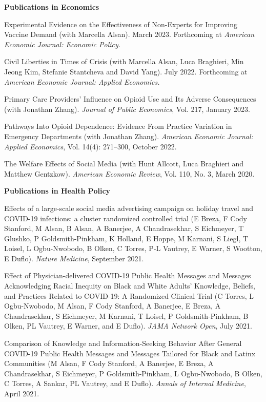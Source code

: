 \documentclass[letterpaper,11pt]{article}
\begin{document}
\begin{normalsize}
\textbf{Publications in Economics}

\setlength{\parindent}{0pt}

\hangindent=0.7cm Experimental Evidence on the Effectiveness of Non-Experts for Improving Vaccine Demand (with Marcella Alsan). March 2023. Forthcoming at \textit{American Economic Journal: Economic Policy.}
\smallskip

\hangindent=0.7cm Civil Liberties in Times of Crisis (with Marcella Alsan, Luca Braghieri, Min Jeong Kim, Stefanie Stantcheva and David Yang). July 2022. Forthcoming at \textit{American Economic Journal: Applied Economics.} 
\smallskip

\hangindent=0.7cm Primary Care Providers’ Influence on Opioid Use and Its Adverse Consequences (with Jonathan Zhang). \textit{Journal of Public Economics}, Vol. 217, January 2023.  
\smallskip

\hangindent=0.7cm Pathways Into Opioid Dependence: Evidence From Practice Variation in Emergency Departments (with Jonathan Zhang). \textit{American Economic Journal: Applied Economics}, Vol. 14(4): 271–300, October 2022. 
\medskip

\hangindent=0.7cm    The Welfare Effects of Social Media (with Hunt Allcott, Luca Braghieri and Matthew Gentzkow). \textit{American Economic Review}, Vol. 110, No. 3, March 2020. 
\smallskip

\textbf{Publications in Health Policy} 
\smallskip

\hangindent=0.7cm Effects of a large-scale social media advertising campaign on holiday travel and COVID-19 infections: a cluster randomized controlled trial (E Breza, F Cody Stanford, M Alsan, B Alsan, A Banerjee, A Chandrasekhar, S Eichmeyer, T Glushko, P Goldsmith-Pinkham, K Holland, E Hoppe, M Karnani, S Liegl, T Loisel, L Ogbu-Nwobodo, B Olken, C Torres, P-L Vautrey, E Warner, S Wootton, E Duflo).  \textit{Nature Medicine}, September 2021.  
\smallskip

\hangindent=0.7cm  Effect of Physician-delivered COVID-19 Public Health Messages and Messages Acknowledging Racial Inequity on Black and White Adults' Knowledge, Beliefs, and Practices Related to COVID-19: A Randomized Clinical Trial (C Torres, L Ogbu-Nwobodo, M Alsan, F Cody Stanford, A Banerjee, E Breza, A Chandrasekhar, S Eichmeyer, M Karnani, T Loisel, P Goldsmith-Pinkham, B Olken, PL Vautrey, E Warner, and E Duflo).   \textit{JAMA Network Open}, July 2021. 
\smallskip

\hangindent=0.7cm Comparison of Knowledge and Information-Seeking Behavior After General COVID-19 Public Health Messages and Messages Tailored for Black and Latinx Communities (M Alsan, F Cody Stanford, A Banerjee, E Breza, A Chandrasekhar, S Eichmeyer, P Goldsmith-Pinkham, L Ogbu-Nwobodo, B Olken, C Torres, A Sankar, PL Vautrey, and E Duflo).  \textit{Annals of Internal Medicine}, April 2021. 
\medskip


\end{normalsize}
\end{document}
